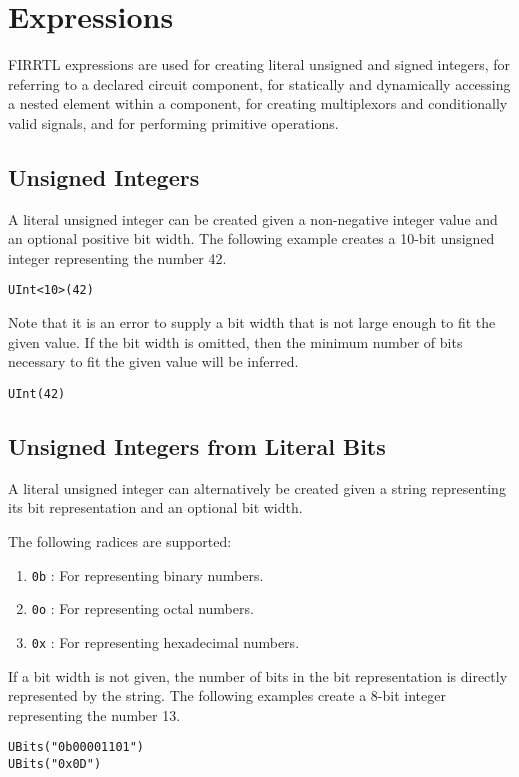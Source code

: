 \documentclass[12pt]{article}
\begin{document}
\section{Expressions}

FIRRTL expressions are used for creating literal unsigned and signed integers, for referring to a declared circuit component, for statically and dynamically accessing a nested element within a component, for creating multiplexors and conditionally valid signals, and for performing primitive operations. 

\subsection{Unsigned Integers}

A literal unsigned integer can be created given a non-negative integer value and an optional positive bit width. The following example creates a 10-bit unsigned integer representing the number 42. 
\begin{verbatim}
UInt<10>(42)
\end{verbatim}

Note that it is an error to supply a bit width that is not large enough to fit the given value. If the bit width is omitted, then the minimum number of bits necessary to fit the given value will be inferred.
\begin{verbatim}
UInt(42)
\end{verbatim}

\subsection{Unsigned Integers from Literal Bits}

A literal unsigned integer can alternatively be created given a string representing its bit representation and an optional bit width. 

The following radices are supported:
\begin{enumerate}
\item \verb|0b| : For representing binary numbers.
\item \verb|0o| : For representing octal numbers.
\item \verb|0x| : For representing hexadecimal numbers.
\end{enumerate}

If a bit width is not given, the number of bits in the bit representation is directly represented by the string. The following examples create a 8-bit integer representing the number 13.
\begin{verbatim}
UBits("0b00001101")
UBits("0x0D")
\end{verbatim}
\end{document}
